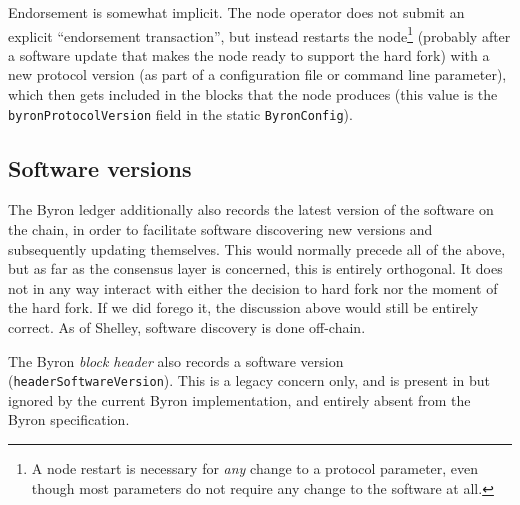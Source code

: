 Endorsement is somewhat implicit. The node operator does not submit an explicit
``endorsement transaction'', but instead restarts the
node\footnote{\label{byron:unnecessary-restarts}A node restart is necessary for
\emph{any} change to a protocol parameter, even though most parameters do not
require any change to the software at all.} (probably after a software update
that makes the node ready to support the hard fork) with a new protocol version
(as part of a configuration file or command line parameter), which then gets included
in the blocks that the node produces (this value is the
\lstinline!byronProtocolVersion! field in the static \lstinline!ByronConfig!).

\subsection{Software versions}

The Byron ledger additionally also records the latest version of the software on
the chain, in order to facilitate software discovering new versions and
subsequently updating themselves. This would normally precede all of the above,
but as far as the consensus layer is concerned, this is entirely orthogonal. It
does not in any way interact with either the decision to hard fork nor the
moment of the hard fork. If we did forego it, the discussion above would still
be entirely correct. As of Shelley, software discovery is done off-chain.

The Byron \emph{block header} also records a software version
(\lstinline!headerSoftwareVersion!). This is a legacy concern only, and is
present in but ignored by the current Byron implementation, and entirely absent
from the Byron specification.
